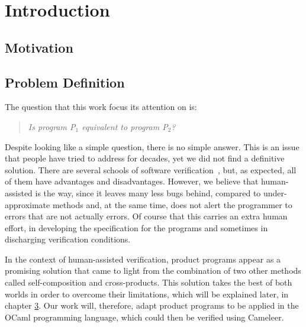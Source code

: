 
%

\chapter{Introduction}
\label{cha:introduction}

\section{Motivation}




\section{Problem Definition}

The question that this work focus its attention on is:

\begin{quote}
    \centering
    \emph{Is program P$_1$ equivalent to program P$_2$?}
\end{quote}

Despite looking like a simple question, there is no simple answer.
This is an issue that people have tried to address for decades, yet we did not find a definitive solution.
There are several schools of software verification~\cite{DBLP:conf/fm/BrainP24}, but, as expected, all of them have advantages and disadvantages.
However, we believe that human-assisted is the way, since it leaves many less bugs behind, compared to under-approximate methods and, at the same time, does not alert the programmer to errors that are not actually errors.
Of course that this carries an extra human effort, in developing the specification for the programs and sometimes in discharging verification conditions.

In the context of human-assisted verification, product programs appear as a promising solution that came to light from the combination of two other methods called self-composition and cross-products.
This solution takes the best of both worlds in order to overcome their limitations, which will be explained later, in chapter \hyperref[cha:state_of_the_art]{3}.
Our work will, therefore, adapt product programs to be applied in the OCaml programming language, which could then be verified using Cameleer.


